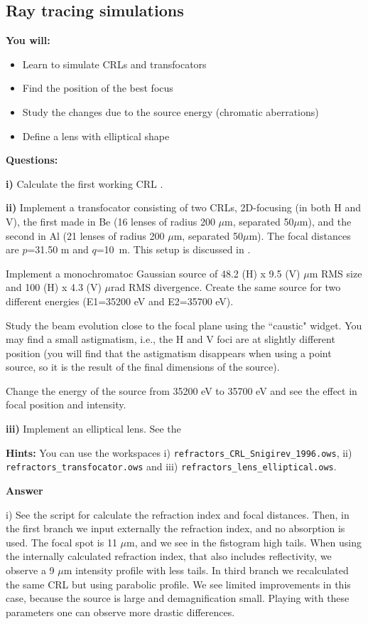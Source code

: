 \subsection{Ray tracing simulations}


\textbf{You will:}

\begin{itemize}
    \item Learn to simulate CRLs and transfocators
    \item Find the position of the best focus
    \item Study the changes due to the source energy (chromatic aberrations)
    \item Define a lens with elliptical shape
\end{itemize}

\textbf{Questions:}

\textbf{i)} Calculate the first working CRL \cite{Snigirev1996}.





\textbf{ii)} 
Implement a transfocator consisting of two CRLs, 2D-focusing (in both H and V), the first made in Be (16 lenses of radius 200 $\mu$m, separated 50$\mu$m), and the second in Al (21 lenses of radius 200 $\mu$m, separated 50$\mu$m). The focal distances are $p$=31.50 m and $q$=10~m. This setup is discussed in \cite{Baltser2011}.

Implement a monochromatoc Gaussian source of 48.2 (H) x 9.5 (V) $\mu$m RMS size and 100 (H) x 4.3 (V) $\mu$rad RMS divergence. Create the same source for two different energies (E1=35200 eV and E2=35700 eV).

Study the beam evolution close to the focal plane using the ``caustic" widget. You may find a small astigmatism, i.e., the H and V foci are at slightly different position (you will find that the astigmatism disappears when using a point source, so it is the result of the final dimensions of the source). 

Change the energy of the source from 35200 eV to 35700 eV and see the effect in focal position and intensity.


\textbf{iii)} 
Implement an elliptical lens. See the 


\textbf{Hints:} You can use the workspaces i) {\tt refractors\_CRL\_Snigirev\_1996.ows}, ii) {\tt refractors\_transfocator.ows} and iii) {\tt refractors\_lens\_elliptical.ows}.


\textbf{Answer}

i) See the script for calculate the refraction index and focal distances. Then, in the first branch we input externally  the refraction index, and no absorption is used. The focal spot is 11 $\mu$m, and we see in the fistogram high tails. When using the internally calculated refraction index, that also includes reflectivity, we observe a 9 $\mu$m intensity profile with less tails. In third branch we recalculated the same CRL but using parabolic profile. We see limited improvements in this case, because the source is large and demagnification small. Playing with these parameters one can observe more drastic differences.


